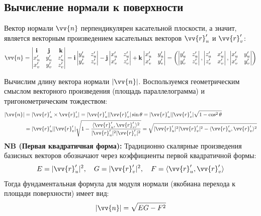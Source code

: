 \documentclass[12pt,a4paper]{article}
\begin{document}
\subsection{Вычисление нормали к поверхности}
Вектор нормали $\vv{n}$ перпендикулярен касательной плоскости, а значит, является векторным произведением касательных векторов $\vv{r}'_u$ и $\vv{r}'_v$:
$$ \vv{n} = \begin{vmatrix} \mathbf{i} & \mathbf{j} & \mathbf{k} \\ x'_u & y'_u & z'_u \\ x'_v & y'_v & z'_v \end{vmatrix} = \mathbf{i} \begin{vmatrix} y'_u & z'_u \\ y'_v & z'_v \end{vmatrix} - \mathbf{j} \begin{vmatrix} x'_u & z'_u \\ x'_v & z'_v \end{vmatrix} + \mathbf{k} \begin{vmatrix} x'_u & y'_u \\ x'_v & y'_v \end{vmatrix} = \left( \begin{vmatrix} y'_u & z'_u \\ y'_v & z'_v \end{vmatrix}, \begin{vmatrix} z'_u & x'_u \\ z'_v & x'_v \end{vmatrix}, \begin{vmatrix} x'_u & y'_u \\ x'_v & y'_v \end{vmatrix} \right) $$

Вычислим длину вектора нормали $|\vv{n}|$. Воспользуемся геометрическим смыслом векторного произведения (площадь параллелограмма) и тригонометрическим тождеством:
\begin{align*}
    |\vv{n}| &= |\vv{r}'_u \times \vv{r}'_v| = |\vv{r}'_u| |\vv{r}'_v| \sin\theta = |\vv{r}'_u| |\vv{r}'_v| \sqrt{1 - \cos^2\theta} \\
    &= |\vv{r}'_u| |\vv{r}'_v| \sqrt{1 - \frac{\langle \vv{r}'_u, \vv{r}'_v \rangle^2}{|\vv{r}'_u|^2 |\vv{r}'_v|^2}} = \sqrt{|\vv{r}'_u|^2 |\vv{r}'_v|^2 - \langle \vv{r}'_u, \vv{r}'_v \rangle^2}
\end{align*}
\textbf{NB (Первая квадратичная форма):} Традиционно скалярные произведения базисных векторов обозначают через коэффициенты первой квадратичной формы:
$$ E = |\vv{r}'_u|^2, \quad G = |\vv{r}'_v|^2, \quad F = \langle \vv{r}'_u, \vv{r}'_v \rangle $$
Тогда фундаментальная формула для модуля нормали (якобиана перехода к площади поверхности) имеет вид:
$$ |\vv{n}| = \sqrt{EG - F^2} $$
\end{document}
